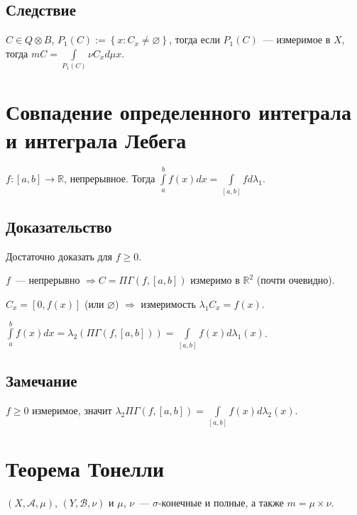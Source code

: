 \documentclass{article}
\begin{document}
        \subsection{Следствие}
        
            $C \in Q \otimes B$, $P_1(C) := \left\{ x : C_x \neq \varnothing \right\}$, тогда если $P_1(C)$~--- измеримое в $X$, тогда $m C = \int\limits_{P_1(C)} \nu C_x d \mu x$.

    \newpage
    
    \section{Совпадение определенного интеграла и интеграла Лебега}
        
        $f : [a, b] \rightarrow \mathbb{R}$, непрерывное. Тогда $\int\limits^b_a f(x) dx = \int\limits_{[a, b]} f d \lambda_1$.
            
        \subsection{Доказательство}
            
            Достаточно доказать для $f \geqslant 0$. 
                
            $f$~--- непрерывно $\Rightarrow C = \Pi \Gamma \left(f, [a, b] \right)$ измеримо в $\mathbb{R}^2$ (почти очевидно).
                
            $C_x = [0, f(x)]$ (или $\varnothing$) $\Rightarrow$ измеримость $\lambda_1 C_x = f(x)$.
                
            $\int\limits^b_a f(x) dx = \lambda_2 \left( \Pi \Gamma \left( f, [a, b] \right) \right) = \int\limits_{[a, b]} f(x) d \lambda_1 (x)$.
                
        \subsection{Замечание}
            
            $f \geqslant 0$ измеримое, значит $\lambda_2 \Pi \Gamma (f, [a, b]) = \int\limits_{[a, b]} f(x) d \lambda_2(x)$.
    
    \newpage
    
    \section{Теорема Тонелли}
    
        $(X, \mathcal{A}, \mu)$, $(Y, \mathcal{B}, \nu)$ и $\mu$, $\nu$~--- $\sigma$-конечные и полные, а также $m = \mu \times \nu$.
        
\end{document}
